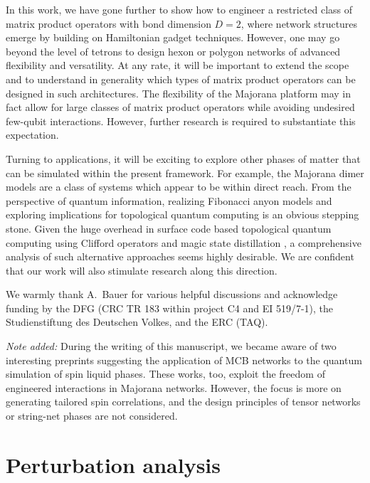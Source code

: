 \documentclass[twocolumn,floats,prx,showpacs]{revtex4-1}
\begin{document}
In this work, we have gone further to show how to engineer a restricted class of matrix product operators with bond dimension $D=2$, where network structures emerge by building on Hamiltonian gadget techniques. However, one may go beyond the level of tetrons to design hexon or polygon networks of advanced flexibility and versatility.  At any rate, it will be important to extend the scope and to understand in generality  which types of matrix product operators can be designed in such architectures. The flexibility of the Majorana platform may in fact allow for large classes of matrix product operators while  avoiding undesired few-qubit interactions.  However, further research is required to substantiate this expectation. 

Turning to applications, 
it will be exciting  to explore other phases of matter that can be simulated within the present framework. For example, the Majorana dimer models \cite{PhysRevB.94.115115,PhysRevB.94.115127} are a class of systems which appear to be within direct reach.
From the perspective of quantum information, realizing
Fibonacci anyon models \cite{Levin2005}  and exploring  implications 
for topological quantum computing is an obvious stepping stone. Given the huge overhead in surface code based topological quantum computing using Clifford operators and magic state distillation \cite{PhysRevA.71.022316}, 
a comprehensive analysis of such alternative approaches seems highly desirable. 
We are confident that our work will also stimulate research along this direction.

\begin{acknowledgements}
We warmly thank A.\ Bauer for various helpful discussions and acknowledge funding by the DFG (CRC TR 183 within project C4 and EI 519/7-1),
the Studienstiftung des Deutschen Volkes, and the ERC (TAQ). 

\emph{Note added:}  During the writing of this manuscript, we became aware of two  interesting preprints
\cite{Sagi2018,Thomson2018}  suggesting the application of  MCB networks  to the quantum simulation 
of spin liquid phases. These works, too, exploit the freedom of  engineered  
interactions in Majorana networks. However, the focus is more on generating tailored spin correlations,  and the design principles of tensor networks  or string-net phases are not considered.  
\end{acknowledgements}

\appendix*
\section{Perturbation analysis} \label{secA}
\end{document}
